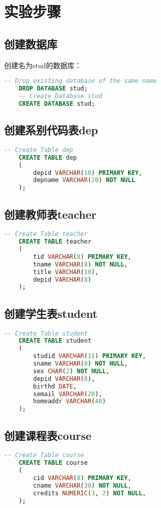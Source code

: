 \documentclass[a4paper]{uestcreport}
\begin{document}
\section{实验步骤}
\subsection{创建数据库}
创建名为stud的数据库：
\begin{lstlisting}[language=SQL]
    -- Drop existing database of the same name
    DROP DATABASE stud;
    -- Create Database stud
    CREATE DATABASE stud;
\end{lstlisting}

\subsection{创建系别代码表dep}
\begin{lstlisting}[language=SQL]
    -- Create Table dep
    CREATE TABLE dep
    (
        depid VARCHAR(10) PRIMARY KEY,
        depname VARCHAR(20) NOT NULL
    );
\end{lstlisting}

\subsection{创建教师表teacher}
\begin{lstlisting}[language=SQL]
    -- Create Table teacher
    CREATE TABLE teacher
    (
        tid VARCHAR(8) PRIMARY KEY,
        tname VARCHAR(8) NOT NULL,
        title VARCHAR(10),
        depid VARCHAR(8)
    );
\end{lstlisting}

\subsection{创建学生表student}
\begin{lstlisting}[language=SQL]
    -- Create Table student
    CREATE TABLE student
    (
        studid VARCHAR(11) PRIMARY KEY,
        sname VARCHAR(8) NOT NULL,
        sex CHAR(2) NOT NULL,
        depid VARCHAR(8),
        birthd DATE,
        semail VARCHAR(20),
        homeaddr VARCHAR(40)
    );
\end{lstlisting}

\subsection{创建课程表course}
\begin{lstlisting}[language=SQL]
    -- Create Table course
    CREATE TABLE course
    (
        cid VARCHAR(8) PRIMARY KEY,
        cname VARCHAR(30) NOT NULL,
        credits NUMERIC(3, 2) NOT NULL,
    );
\end{lstlisting}
\end{document}
